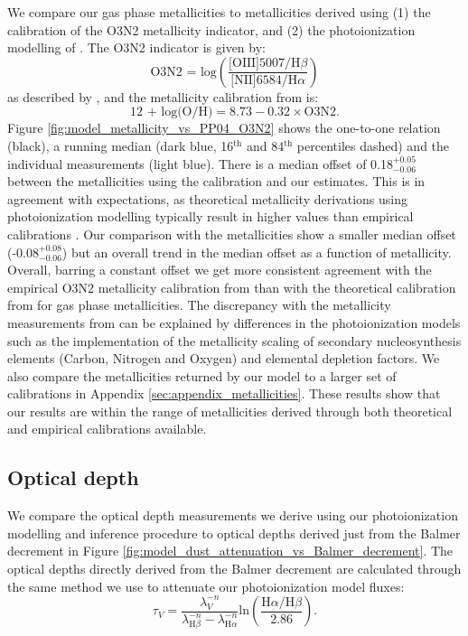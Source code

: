 \documentclass[fleqn,usenatbib]{mnras}
\begin{document}
We compare our gas phase metallicities to metallicities derived using (1) the \cite{pettini2004} calibration of the O3N2 metallicity indicator, and (2) the photoionization modelling of \cite{tremonti2004}. The O3N2 indicator is given by:
\begin{equation}
\label{eq:O3N2_indicator}
    \textrm{O3N2 = log}\left(\frac{\textrm{[OIII]}5007 / \textrm{H}\beta}{\textrm{[NII]}6584 / \textrm{H}\alpha}\right)
\end{equation}
as described by \citet{alloin1979}, and the metallicity calibration from \cite{pettini2004} is:
\begin{equation}
    \textrm{12 + log(O/H)} = 8.73 - 0.32 \times \textrm{O3N2}.
\end{equation}
Figure \ref{fig:model_metallicity_vs_PP04_O3N2} shows the one-to-one relation (black), a running median (dark blue, 16$^{\textrm{th}}$ and 84$^{\textrm{th}}$ percentiles dashed) and the individual measurements (light blue). There is a median offset of 0.18$_{-0.06}^{+0.05}$ between the metallicities using the \cite{pettini2004} calibration and our estimates. This is in agreement with expectations, as theoretical metallicity derivations using photoionization modelling typically result in higher values than empirical calibrations \citep{kewley2008}. Our comparison with the \cite{tremonti2004} metallicities show a smaller median offset (-0.08$_{-0.06}^{+0.08}$) but an overall trend in the median offset as a function of metallicity. Overall, barring a constant offset we get more consistent agreement with the empirical O3N2 metallicity calibration from \cite{pettini2004} than with the theoretical calibration from \cite{tremonti2004} for gas phase metallicities. The discrepancy with the metallicity measurements from \cite{tremonti2004} can be explained by differences in the photoionization models such as the implementation of the metallicity scaling of secondary nucleosynthesis elements (Carbon, Nitrogen and Oxygen) and elemental depletion factors. We also compare the metallicities returned by our model to a larger set of calibrations in Appendix \ref{sec:appendix_metallicities}. These results show that our results are within the range of metallicities derived through both theoretical and empirical calibrations available. 

\subsection{Optical depth}
We compare the optical depth measurements we derive using our photoionization modelling and inference procedure to optical depths derived just from the Balmer decrement in Figure \ref{fig:model_dust_attenuation_vs_Balmer_decrement}. The optical depths directly derived from the Balmer decrement are calculated through the same method we use to attenuate our photoionization model fluxes:
\begin{equation}
\label{eq:optical_depth_BD}
    \tau_{V} = \frac{\lambda_{V}^{-n}}{\lambda_{\textrm{H}\beta}^{-n} - \lambda_{\textrm{H}\alpha}^{-n}} \textrm{ln}\left( \frac{\textrm{H}\alpha/\textrm{H}\beta}{2.86} \right) .
\end{equation}
\end{document}
